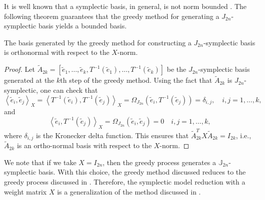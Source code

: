It is well known that a symplectic basis, in general, is not norm bounded \cite{doi:10.1137/050628519}. The following theorem guarantees that the greedy method for generating a $J_{2n}$-symplectic basis yields a bounded basis.
\begin{theorem} \label{thm:3}
The basis generated by the greedy method for constructing a $J_{2n}$-symplectic basis is orthonormal with respect to the $X$-norm.
\end{theorem}
\begin{proof}
Let $\tilde A_{2k}=[\tilde e_1,\dots,\tilde e_k,T^{-1} (\tilde e_1),\dots,T^{-1}(\tilde e_k)]$ be the $J_{2n}$-symplectic basis generated at the $k$th step of the greedy method. Using the fact that $\tilde A_{2k}$ is $J_{2n}$-symplectic, one can check that
\begin{equation} \label{eq:normmor.12}
	\left\langle \tilde e_i, \tilde e_j\right\rangle_X = \left\langle T^{-1} ( \tilde e_i),T^{-1}( \tilde e_j)\right\rangle_X = \Omega_{J_{2n}}(\tilde e_i,T^{-1}(\tilde e_j))=\delta_{i,j}, \quad i,j=1,\dots,k,	
\end{equation}
and
\begin{equation} \label{eq:normmor.13}
	\left\langle \tilde e_i,T^{-1} (\tilde e_j) \right\rangle_X = \Omega_{J_{2n}}(\tilde e_i, \tilde e_j) = 0\quad i,j=1,\dots,k,
\end{equation}
where $\delta_{i,j}$ is the Kronecker delta function. This ensures that $\tilde A_{2k}^TX\tilde A_{2k} = I_{2k}$, i.e., $\tilde A_{2k}$ is an ortho-normal basis with respect to the $X$-norm.
\end{proof}
We note that if we take $X=I_{2n}$, then the greedy process generates a $\mathbb J_{2n}$- symplectic basis. With this choice, the greedy method discussed reduces to the greedy process discussed in . Therefore, the symplectic model reduction with a weight matrix $X$ is a generalization of the method discussed in .

